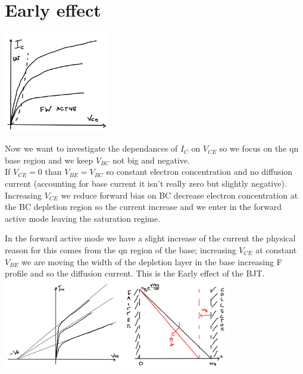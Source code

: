 \section{Early effect}

\centering
\includegraphics[width=0.35\textwidth]{bjt12.png}\\
\raggedright

Now we want to investigate the dependances of $I_C$ on $V_{CE}$ so we focus on the qn base region and we keep $V_{BC}$ not big and negative.\\
If $V_{CE}=0$ than $V_{BE}=V_{BC}$ so constant electron concentration and no diffusion current (accounting for base current it isn't really zero but slightly negative).
Increasing $V_{CE}$ we reduce forward bias on BC decrease electron concentration at the BC depletion region so the current increase and we enter in the forward active mode leaving the saturation regime.

\vspace{5mm}

In the forward active mode we have a slight increase of the current the physical reason for this comes from the qn region of the base; increasing $V_{CE}$ at constant $V_{BE}$ we are moving the width of the depletion layer in the base increasing F profile and so the diffusion current. This is the Early effect of the BJT.\\


\centering
\includegraphics[width=0.75\textwidth]{ear.png}\\
\raggedright


